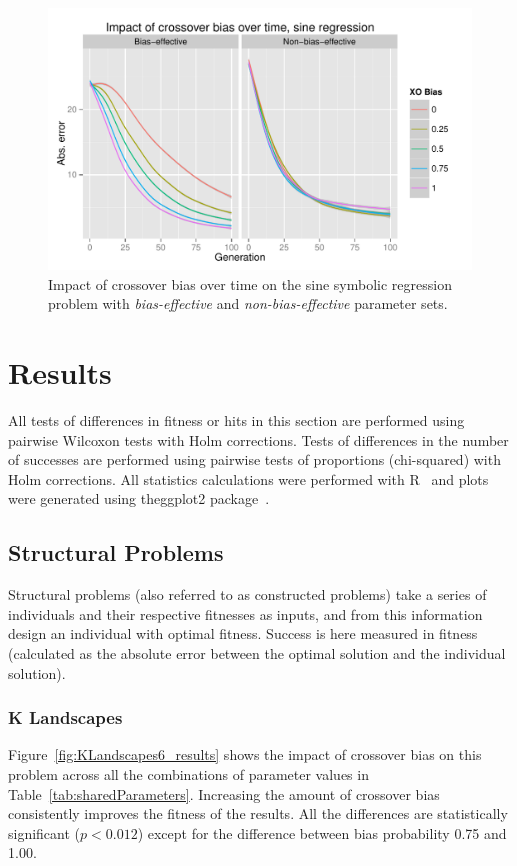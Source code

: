 \documentclass{sig-alternate}
\begin{document}
\begin{figure}
	\centering
	\includegraphics[width=0.45 \textwidth]{Plots/Sine_fitness_vs_gen_facets.pdf}
	\caption{Impact of crossover bias over time on the sine symbolic regression problem with
		\emph{bias-effective} and \emph{non-bias-effective} parameter sets.}
	\label{fig:sineFitnessVsGenFacets}
\end{figure}

\section{Results} \label{sec:Results}

All tests of differences in fitness or hits in this section are performed using pairwise Wilcoxon tests with Holm
corrections. Tests of differences in the number of successes are performed using pairwise tests of proportions
(chi-squared) with Holm corrections. All statistics calculations were performed with R~\cite{R} and plots were
generated using the\linebreak ggplot2 package~\cite{ggplot2Book}.

\subsection{Structural Problems}

Structural problems (also referred to as constructed problems) take a series of individuals and their respective
fitnesses as inputs, and from this information design an individual with optimal fitness. Success is here measured in
fitness (calculated as the absolute error between the optimal solution and the individual solution).

\subsubsection{K Landscapes}

Figure~\ref{fig:KLandscapes6_results} shows the impact of crossover bias on this problem across all the combinations of
parameter values in Table~\ref{tab:sharedParameters}. Increasing the amount of crossover bias consistently improves the
fitness of the results. All the differences are statistically significant ($p < 0.012$) except for the difference
between bias probability 0.75 and 1.00.
\end{document}
